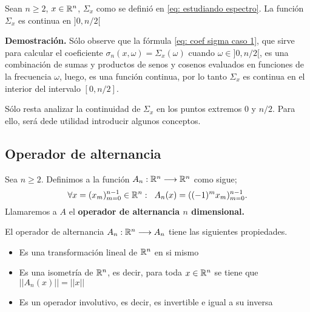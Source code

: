 \begin{prop}
\label{prop: cont interior espectro}
Sean $n \geq 2$, $x \in \mathbb{R}^{n}$,
$\Sigma_{x}$ como se definió en \eqref{eq: estudiando espectro}.
La función $\Sigma_{x}$ es continua en 
$]0, n/2[$
\end{prop}
\noindent
\textbf{Demostración.}
Sólo observe que la fórmula
\eqref{eq: coef sigma caso 1}, que sirve
para calcular el coeficiente $\sigma_{n} (x, \omega) = \Sigma_{x}(\omega)$
cuando $\omega \in ]0, n/2[$, es una combinación
de sumas y productos de senos y cosenos
evaluados en funciones de la frecuencia $\omega$, luego, 
es una función continua, por lo tanto $\Sigma_{x}$
es continua en el interior del intervalo 
$[0, n/2]$.
\QEDB
\vspace{0.2cm}

Sólo resta analizar la continuidad de 
$\Sigma_{x}$ en los puntos extremos $0$ y $n/2$.
Para ello,
será dede utilidad introducir algunos conceptos.

\subsection{Operador de alternancia}

\begin{defi}
Sea $n \geq 2$. Definimos a la función 
$A_{n}: \mathbb{R}^{n} \longrightarrow \mathbb{R}^{n}$ como sigue;
\[
\forall x= (x_{m})_{m=0}^{n-1} \in \mathbb{R}^{n}: \hspace{0.2cm}
A_{n}(x) = ((-1)^{m}x_{m})_{m=0}^{n-1}.
\]
Llamaremos a $A$ el \textbf{operador de alternancia $n$ dimensional.}
\end{defi}


\begin{obs}
El operador de alternancia $A_{n}: \mathbb{R}^{n} \longrightarrow A_{n}$
tiene las siguientes propiedades.
\begin{itemize}
\item Es una transformación lineal de $\mathbb{R}^{n}$ en si mismo
\item Es una isometría de $\mathbb{R}^{n}$, es decir, para toda
$x \in \mathbb{R}^{n}$ se tiene que $|| A_{n}(x) || = || x ||$
\item Es un operador involutivo, es decir, es invertible e igual
a su inversa
\end{itemize}
\end{obs}

